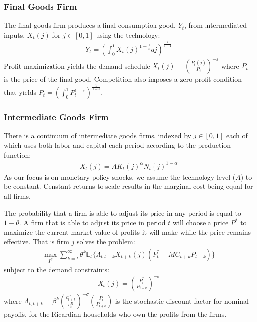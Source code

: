 \documentclass[titlepage]{\econtex}\newcommand{\texname}{ConsumptionHeterogeneity}
\begin{document}
\subsubsection{Final Goods Firm}
The final goods firm produces a final consumption good, $Y_t$, from intermediated inputs, $X_t(j)$ for $j \in [0,1]$ using the technology:
\begin{align*}
Y_t = \left( \int_0^1 X_t(j)^{1-\frac{1}{\varepsilon}} dj \right)^{\frac{\varepsilon}{\varepsilon-1}}
\end{align*}
Profit maximization yields the demand schedule $X_t(j) = \left(\frac{P_t(j)}{P_t}\right)^{-\varepsilon}$ where $P_t$ is the price of the final good. Competition also imposes a zero profit condition that yields $P_t = \left(\int_0^1 P_t^{1-\varepsilon}\right)^{\frac{1}{1-\varepsilon}}$.

\subsubsection{Intermediate Goods Firm}
There is a continuum of intermediate goods firms, indexed by $j \in [0,1]$ each of which uses both labor and capital each period according to the production function:
\begin{align*}
X_t(j) = A K_t(j)^\alpha N_t(j)^{1-\alpha}
\end{align*}
As our focus is on monetary policy shocks, we assume the technology level ($A$) to be constant. Constant returns to scale results in the marginal cost being equal for all firms.

The probability that a firm is able to adjust its price in any period is equal to $1-\theta$. A firm that is able to adjust its price in period $t$ will choose a price $P^*$ to maximize the current market value of profits it will make while the price remains effective. That is firm $j$ solves the problem:
\begin{align}
\underset{P^*}{\max} \sum_{k=t}^{\infty} \theta^k \mathbb{E}_t \{{\Lambda}_{t,t+k} X_{t+k}(j) (P_t^* - MC_{t+k}P_{t+k}) \} \label{profit_max}
\end{align}
subject to the demand constraints:
\begin{align}
X_t(j) = \left(\frac{P_t^*}{P_{t+k}}\right)^{-\varepsilon} \label{demand_constraint}
\end{align}
where ${\Lambda}_{t,t+k} = \beta^k \left(\frac{c^R_{t+k}}{c^R_{t}}\right)^{-\sigma} \left( \frac{P_t}{P_{t+k}} \right)$ is the stochastic discount factor for nominal payoffs, for the Ricardian households who own the profits from the firms. 
\end{document}
